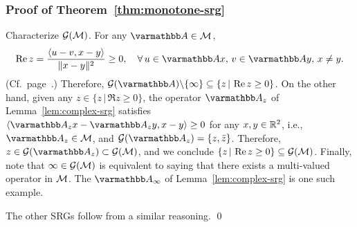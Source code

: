 \documentclass[10pt,mathserif]{beamer}
\begin{document}
\begin{frame}
\frametitle{Proof of Theorem~\ref{thm:monotone-srg}}
Characterize ${\mathcal{G}}({\mathcal{M}})$.
For any $\opA\in \cM$,
\[
\Re z=\frac{\langle u-v,x-y\rangle}{\|x-y\|^2}\ge 0,
\quad\forall\,u\in \opA x,\,v\in \opA y,\,x\ne y.
\]
(Cf.\ page~\pageref{slide_srg_op}.)
Therefore, $\cG(\opA)\backslash\{\infty\}\subseteq \{z\,|\,\Re z\ge 0\}$.
On the other hand, given any $z\in \{z\,|\,\Re z\ge 0\}$, the operator $\opA_z$ of Lemma~\ref{lem:complex-srg} satisfies $\langle \opA_zx-\opA_zy,x-y\rangle \ge 0$ for any $x,y\in \mathbb{R}^2$, i.e., $\opA_z\in \cM$, and $\cG(\opA_z)=\{z,\bar{z}\}$.
Therefore, $z\in\cG(\opA_z)\subset \cG(\cM)$, and we conclude $\{z\,|\,\operatorname{Re} z\ge 0\}\subseteq {\mathcal{G}}(\mathcal{M})$.
Finally, note that $\infty\in {\mathcal{G}}({\mathcal{M}})$ is equivalent to saying that there exists a multi-valued operator in ${\mathcal{M}}$.
The $\opA_\infty$ of Lemma~\ref{lem:complex-srg} is one such example.
\vspace{0.2in}

The other SRGs follow from a similar reasoning.
\qed
\end{frame}
\end{document}
